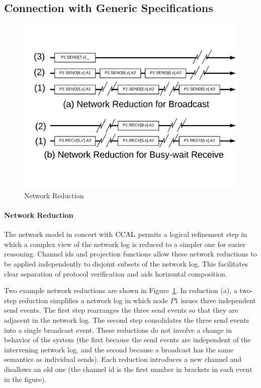 \subsection{Connection with Generic Specifications}
\label{chapter:witnesspassing:subsec:connection}

\begin{figure}
\begin{center}
\includegraphics[scale=0.3]{figs/witnesspassing/network_reduction.pdf}
\end{center}
\caption{Network Reduction}
\label{fig:chapter:witnesspassing:network-reduction}
\end{figure}

\paragraph{Network Reduction}
The network model in concert with $\mathrm{CCAL}$ permits a logical refinement step in
which a complex view of the network log is reduced to a simpler one for easier
reasoning. Channel ids and projection functions allow these network
reductions to be applied independently to disjoint subsets of the network log.
This facilitates clear separation of protocol verification and aids
horizontal composition.

Two example network reductions are shown in Figure~\ref{fig:chapter:witnesspassing:network-reduction}. In
reduction (a), a two-step reduction simplifies a network log in which node $P1$
issues three independent send events. The first step rearranges the three send
events so that they are adjacent in the network log. The second step
consolidates the three send events into a single broadcast event. These
reductions do not involve a change in behavior of the system (the first because
the send events are independent of the intervening network log, and the second
because a broadcast has the same semantics as individual sends). Each reduction
introduces a new channel and disallows an old one (the channel id is the first
number in brackets in each event in the figure).

